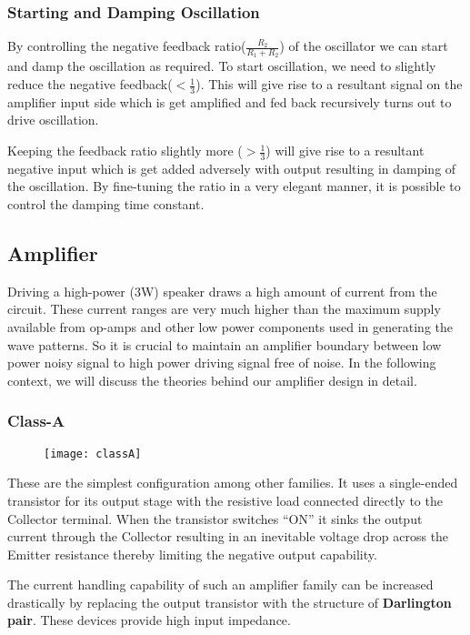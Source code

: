 \subsubsection*{Starting and Damping Oscillation}
By controlling the negative feedback ratio($\frac{R_2}{R_1+R_2}$) of the oscillator we can start and damp the oscillation as required. To start oscillation, we need to slightly reduce the negative feedback($<\frac{1}{3}$). This will give rise to a resultant signal on the amplifier input side which is get amplified and fed back recursively turns out to drive oscillation.
\par
Keeping the feedback ratio slightly more ($>\frac{1}{3}$) will give rise to a resultant negative input which is get added adversely with output resulting in damping of the oscillation. By fine-tuning the ratio in a very elegant manner, it is possible to control the damping time constant.
\subsection{Amplifier}
Driving a high-power (3W) speaker draws a high amount of current from the circuit. These current ranges are very much higher than the maximum supply available from op-amps and other low power components used in generating the wave patterns. So it is crucial to maintain an amplifier boundary between low power noisy signal to high power driving signal free of noise. In the following context, we will discuss the theories behind our amplifier design in detail.
\subsubsection*{Class-A }
\begin{figure}[h]
  \begin{center}
    \texttt{[image: classA]}
    \vspace*{-.5cm}
  \end{center}
\end{figure}
These are the simplest configuration among other families. It uses a single-ended transistor for its output stage with the resistive load connected directly to the Collector terminal. When the transistor switches “ON” it sinks the output current through the Collector resulting in an inevitable voltage drop across the Emitter resistance thereby limiting the negative output capability.
\par
The current handling capability of such an amplifier family can be increased drastically by replacing the output transistor with the structure of \textbf{Darlington pair}. These devices provide high input impedance.
